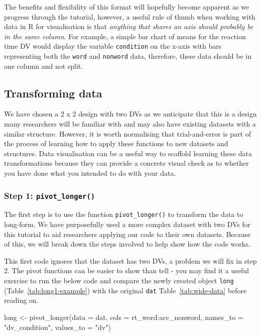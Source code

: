 \documentclass[
  english,
  doc,floatsintext]{apa6}
\newenvironment{Shaded}{\begin{snugshade}}{\end{snugshade}}
\newcommand{\AttributeTok}[1]{\textcolor[rgb]{0.77,0.63,0.00}{#1}}
\newcommand{\FunctionTok}[1]{\textcolor[rgb]{0.00,0.00,0.00}{#1}}
\newcommand{\NormalTok}[1]{#1}
\newcommand{\OtherTok}[1]{\textcolor[rgb]{0.56,0.35,0.01}{#1}}
\newcommand{\SpecialCharTok}[1]{\textcolor[rgb]{0.00,0.00,0.00}{#1}}
\newcommand{\StringTok}[1]{\textcolor[rgb]{0.31,0.60,0.02}{#1}}
\begin{document}
The benefits and flexibility of this format will hopefully become apparent as we progress through the tutorial, however, a useful rule of thumb when working with data in R for visualisation is that \emph{anything that shares an axis should probably be in the same column}. For example, a simple bar chart of means for the reaction time DV would display the variable \texttt{condition} on the x-axis with bars representing both the \texttt{word} and \texttt{nonword} data, therefore, these data should be in one column and not split.

\hypertarget{transforming-data-1}{%
\subsection{Transforming data}\label{transforming-data-1}}

We have chosen a 2 x 2 design with two DVs as we anticipate that this is a design many researchers will be familiar with and may also have existing datasets with a similar structure. However, it is worth normalising that trial-and-error is part of the process of learning how to apply these functions to new datasets and structures. Data visualisation can be a useful way to scaffold learning these data transformations because they can provide a concrete visual check as to whether you have done what you intended to do with your data.

\hypertarget{step-1-pivot_longer}{%
\subsubsection{\texorpdfstring{Step 1: \texttt{pivot\_longer()}}{Step 1: pivot\_longer()}}\label{step-1-pivot_longer}}

The first step is to use the function \texttt{pivot\_longer()} to transform the data to long-form. We have purposefully used a more complex dataset with two DVs for this tutorial to aid researchers applying our code to their own datasets. Because of this, we will break down the steps involved to help show how the code works.

This first code ignores that the dataset has two DVs, a problem we will fix in step 2. The pivot functions can be easier to show than tell - you may find it a useful exercise to run the below code and compare the newly created object \texttt{long} (Table~\ref{tab:long1-example}) with the original \texttt{dat} Table~\ref{tab:wide-data} before reading on.

\begin{Shaded}
\begin{Highlighting}[]
\NormalTok{long }\OtherTok{\textless{}{-}} \FunctionTok{pivot\_longer}\NormalTok{(}\AttributeTok{data =}\NormalTok{ dat, }
                     \AttributeTok{cols =}\NormalTok{ rt\_word}\SpecialCharTok{:}\NormalTok{acc\_nonword, }
                     \AttributeTok{names\_to =} \StringTok{"dv\_condition"}\NormalTok{,}
                     \AttributeTok{values\_to =} \StringTok{"dv"}\NormalTok{)}
\end{Highlighting}
\end{Shaded}
\end{document}
